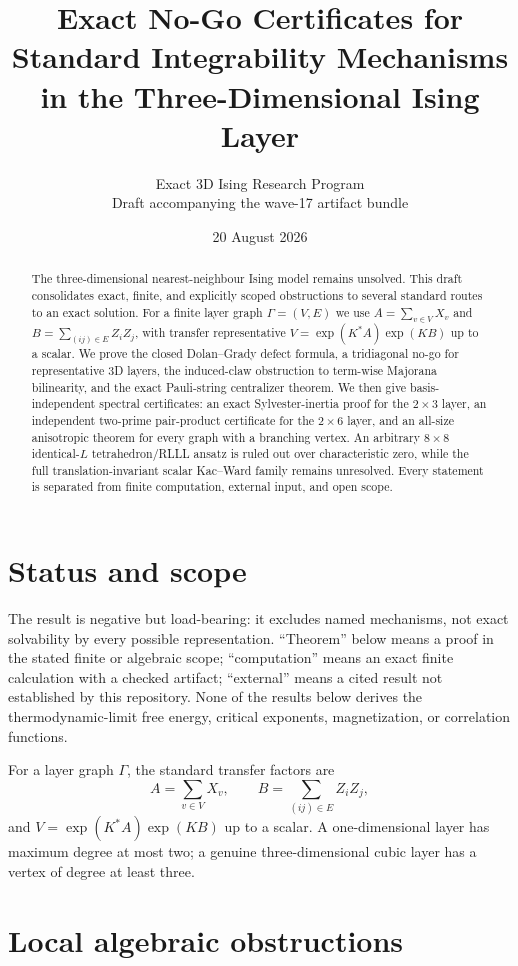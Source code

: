 \documentclass[11pt]{article}
\title{Exact No-Go Certificates for Standard Integrability Mechanisms\\in the Three-Dimensional Ising Layer}
\author{Exact 3D Ising Research Program\\\small Draft accompanying the wave-17 artifact bundle}
\date{20 August 2026}
\begin{document}
\maketitle
\begin{abstract}
The three-dimensional nearest-neighbour Ising model remains unsolved. This draft consolidates exact, finite, and explicitly scoped obstructions to several standard routes to an exact solution. For a finite layer graph $\Gamma=(V,E)$ we use $A=\sum_{v\in V}X_v$ and $B=\sum_{(ij)\in E}Z_iZ_j$, with transfer representative $V=\exp(K^*A)\exp(KB)$ up to a scalar. We prove the closed Dolan--Grady defect formula, a tridiagonal no-go for representative 3D layers, the induced-claw obstruction to term-wise Majorana bilinearity, and the exact Pauli-string centralizer theorem. We then give basis-independent spectral certificates: an exact Sylvester-inertia proof for the $2\times3$ layer, an independent two-prime pair-product certificate for the $2\times6$ layer, and an all-size anisotropic theorem for every graph with a branching vertex. An arbitrary $8\times8$ identical-$L$ tetrahedron/RLLL ansatz is ruled out over characteristic zero, while the full translation-invariant scalar Kac--Ward family remains unresolved. Every statement is separated from finite computation, external input, and open scope.
\end{abstract}

\section{Status and scope}
The result is negative but load-bearing: it excludes named mechanisms, not exact solvability by every possible representation. ``Theorem'' below means a proof in the stated finite or algebraic scope; ``computation'' means an exact finite calculation with a checked artifact; ``external'' means a cited result not established by this repository. None of the results below derives the thermodynamic-limit free energy, critical exponents, magnetization, or correlation functions.

For a layer graph $\Gamma$, the standard transfer factors are
\[
 A=\sum_{v\in V}X_v,\qquad B=\sum_{(ij)\in E}Z_iZ_j,
\]
and $V=\exp(K^*A)\exp(KB)$ up to a scalar. A one-dimensional layer has maximum degree at most two; a genuine three-dimensional cubic layer has a vertex of degree at least three.

\section{Local algebraic obstructions}
\end{document}
